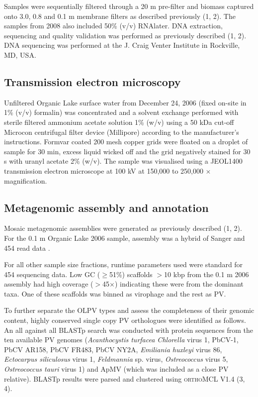 Samples were sequentially filtered through a 20 \textmu{}m pre-filter and biomass captured onto 3.0, 0.8 and 0.1 \textmu{}m membrane filters as described previously (1, 2). 
The samples from 2008 also included 50\% (v/v) \textsc{RNA}later. 
DNA extraction, sequencing and quality validation was performed as previously described (1, 2). 
DNA sequencing was performed at the J. Craig Venter Institute in Rockville, \textsc{MD}, \textsc{USA}.  

\subsection{Transmission electron microscopy}
Unfiltered Organic Lake surface water from December 24, 2006 (fixed on-site in 1\% (v/v) formalin) was concentrated and a solvent exchange performed with sterile filtered ammonium acetate solution 1\% (w/v) using a 50 kDa cut-off Microcon centrifugal filter device (Millipore) according to the manufacturer’s instructions. 
Formvar coated 200 mesh copper grids were floated on a droplet of sample for 30 min, excess liquid wicked off and the grid negatively stained for 30 s with uranyl acetate 2\% (w/v). 
The sample was visualised using a \textsc{JEOL1400} transmission electron microscope at 100 kV at 150,000 to 250,000 $\times$ magnification.

\subsection{Metagenomic assembly and annotation}
Mosaic metagenomic assemblies were generated as previously described (1, 2). 
For the 0.1 \textmu{}m Organic Lake 2006 sample, assembly was a hybrid of Sanger and 454 read data . 

For all other sample size fractions, runtime parameters used were standard for 454 sequencing data. 
Low GC ($\ge$51\%) scaffolds $>$10 kbp from the 0.1 \textmu{}m 2006 assembly had high coverage ($>$45$\times$) indicating these were from the dominant taxa. 
One of these scaffolds was binned as virophage and the rest as \ac{PV}. 

To further separate the \ac{OLPV} types and assess the completeness of their genomic content, highly conserved single copy PV orthologues were identified as follows. 
An all against all \ac{BLAST}p search was conducted with protein sequences from the ten available \ac{PV} genomes 
(\emph{Acanthocystis turfacea Chlorella} virus 1, PbCV-1, PbCV AR158, PbCV FR483, PbCV NY2A, \emph{Emiliania huxleyi} virus 86, \emph{Ectocarpus siliculosus} virus 1, \emph{Feldmannia} sp. virus, \emph{Ostreococcus} virus 5, \emph{Ostreococcus tauri} virus 1) and \ac{ApMV} (which was included as a close \ac{PV} relative). 
\ac{BLAST}p results were parsed and clustered using \textsc{orthoMCL} V1.4 (3, 4). 

